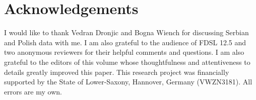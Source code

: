 \documentclass[output=paper,
modfonts,
newtxmath,colorlinks,citecolor=brown
]{langscibook}
\begin{document}
\section*{Acknowledgements}
I would like to thank Vedran Dronjic and  Bogna Wiench for discussing Serbian and Polish data with me. I am also grateful to the audience of FDSL 12.5 and two anonymous reviewers for their helpful comments and questions. I am also grateful to the editors of this volume whose thoughtfulness and attentiveness to details greatly improved this paper. This research project was financially supported by the State of Lower-Saxony, Hannover, Germany (VWZN3181). All errors are my own.

\sloppy
\printbibliography[heading=subbibliography,notkeyword=this]
\end{document}
